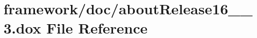 \hypertarget{about_release16__10__3_8dox}{}\section{framework/doc/about\+Release16\+\_\+\_\+3.dox File Reference}
\label{about_release16__10__3_8dox}
